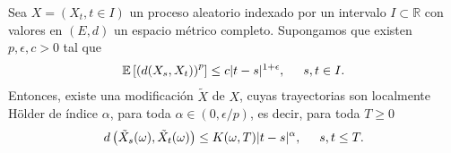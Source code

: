 \begin{theorem}
Sea $X = (X_t, t \in I)$ un proceso aleatorio indexado por un intervalo $I \subset \mathbb{R}$ con valores en $(E, d)$ un espacio métrico completo. Supongamos que existen $p, \epsilon, c > 0$ tal que
	\begin{align*}
	\mathbb{E} \left[\left( d(X_s, X_t)\right)^p\right] \leq c|t - s|^{1 + \epsilon}, \hspace{0.5cm} s, t \in I.
	\end{align*}
Entonces, existe una modificación $\tilde{X}$ de $X$, cuyas trayectorias son localmente Hölder de índice $\alpha$, para toda $\alpha \in (0, \epsilon / p)$, es decir, para toda $T \geq 0$
	\begin{align*}
	d \left( \tilde{X}_s(\omega), \tilde{X}_t(\omega)\right) \leq K(\omega, T) |t - s|^{\alpha}, \hspace{0.5cm} s, t \leq T.
	\end{align*}
\end{theorem}
